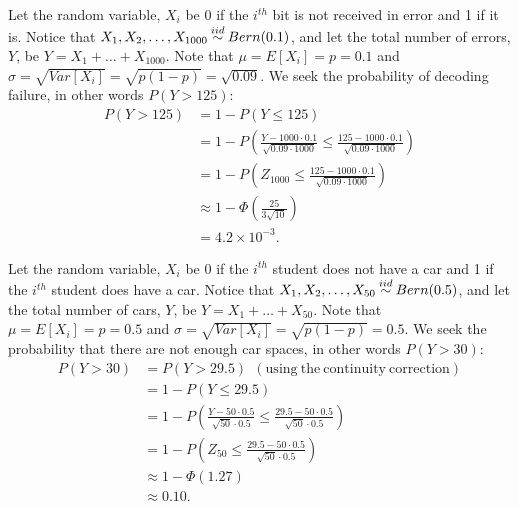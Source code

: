 \begin{problem}{3} Let the random variable, $X_i$ be 0 if the $i^{th}$ bit is not received in error and 1 if it is.  Notice that $X_1, X_2, \ldots, X_{1000} \distas{iid} Bern(0.1)$, and let the total number of errors, $Y$, be $Y=X_1+\ldots+X_{1000}$.  Note that $\mu = E[X_i] = p = 0.1$ and $\sigma = \sqrt{Var[X_i]} = \sqrt{p(1-p)} = \sqrt{0.09}$.  We seek the probability of decoding failure, in other words $P(Y>125)$:
\begin{align*}
P(Y>125) &= 1- P(Y \le125) \\
& = 1- P\left (\frac{Y-1000\cdot 0.1}{\sqrt{0.09\cdot 1000}} \le \frac{125-1000\cdot 0.1}{\sqrt{0.09\cdot 1000}}\right ) \\
& = 1- P\left (Z_{1000} \le \frac{125-1000\cdot 0.1}{\sqrt{0.09\cdot 1000}}\right ) \\
& \approx 1- \Phi \left(\frac{25}{3\sqrt{10}} \right)\\
&= 4.2 \times 10^{-3}.
\end{align*}

\end{problem}

\begin{problem}{4} Let the random variable, $X_i$ be 0 if the $i^{th}$ student does not have a car and 1 if the $i^{th}$ student does have a car.  Notice that $X_1, X_2, \ldots, X_{50} \distas{iid} Bern(0.5)$, and let the total number of cars, $Y$, be $Y=X_1+\ldots+X_{50}$.  Note that $\mu = E[X_i] = p = 0.5$ and $\sigma = \sqrt{Var[X_i]} = \sqrt{p(1-p)} = 0.5$.  We seek the probability that there are not enough car spaces, in other words $P(Y>30)$:
\begin{align*}
P(Y>30) &= P(Y>29.5)~~\mathrm{(using~the~continuity~correction)} \\
&=1- P(Y \le 29.5) \\
& = 1- P\left (\frac{Y-50\cdot 0.5}{\sqrt{50}\cdot 0.5} \le \frac{29.5-50\cdot 0.5}{\sqrt{50}\cdot 0.5}\right ) \\
& = 1- P\left (Z_{50} \le \frac{29.5-50\cdot 0.5}{\sqrt{50}\cdot 0.5}\right ) \\
& \approx 1- \Phi \left(1.27 \right)\\
& \approx 0.10.
\end{align*}

\end{problem}


